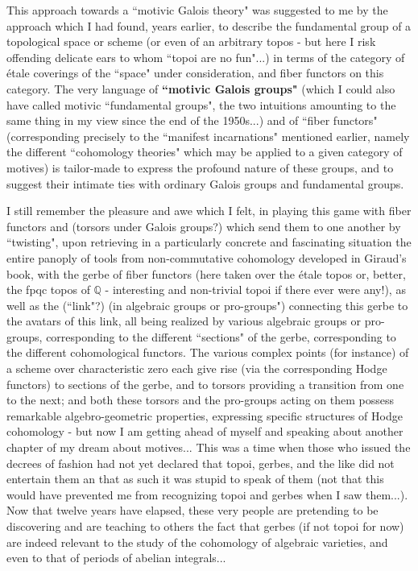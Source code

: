 This approach towards a ``motivic Galois theory" was suggested to me by the approach which I had found, years earlier, to describe the fundamental group of a topological space or scheme (or even of an arbitrary topos - but here I risk offending delicate ears to whom ``topoi are no fun"...) in terms of the category of \'etale coverings of the ``space" under consideration, and fiber functors on this category. The very language of \textbf{``motivic Galois groups"} (which I could also have called motivic ``fundamental groups", the two intuitions amounting to the same thing in my view since the end of the 1950s...) and of ``fiber functors" (corresponding precisely to the ``manifest incarnations" mentioned earlier, namely the different ``cohomology theories" which may be applied to a given category of motives) is tailor-made to express the profound nature of these groups, and to suggest their intimate ties with ordinary Galois groups and fundamental groups.

I still remember the pleasure and awe which I felt, in playing this game with fiber functors and (torsors under Galois groups?) which send them to one another by ``twisting", upon retrieving in a particularly concrete and fascinating situation the entire panoply of tools from non-commutative cohomology developed in Giraud's book, with the gerbe of fiber functors (here taken over the \'etale topos or, better, the fpqc topos of $\mathbb{Q}$ - interesting and non-trivial topoi if there ever were any!), as well as the (``link"?) (in algebraic groups or pro-groups") connecting this gerbe to the avatars of this link, all being realized by various algebraic groups or pro-groups, corresponding to the different ``sections" of the gerbe, corresponding to the different cohomological functors.
The various complex points (for instance) of a scheme over characteristic zero each give rise (via the corresponding Hodge functors) to sections of the gerbe, and to torsors providing a transition from one to the next; and both these torsors and the pro-groups acting on them possess remarkable algebro-geometric properties, expressing specific structures of Hodge cohomology - but now I am getting ahead of myself and speaking about another chapter of my dream about motives... This was a time when those who issued the decrees of fashion had not yet declared that topoi, gerbes, and the like did not entertain them an that as such it was stupid to speak of them (not that this would have prevented me from recognizing topoi and gerbes when I saw them...). Now that twelve years have elapsed, these very people are pretending to be discovering and are teaching to others the fact that gerbes (if not topoi for now) are indeed relevant to the study of the cohomology of algebraic varieties, and even to that of periods of abelian integrals...

